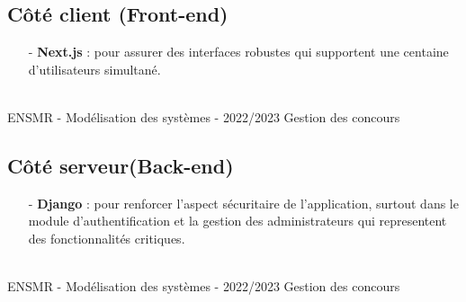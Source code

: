 \subsection{Côté client (Front-end)}
\begin{itemize}
	\item[-] \textbf{Next.js} : pour assurer des interfaces robustes qui supportent une centaine
	d'utilisateurs simultané.
\end{itemize}

\vfill
\noindent\makebox[\linewidth]{\rule{.8\paperwidth}{.6pt}}\\[0.2cm]
ENSMR - Modélisation des systèmes - 2022/2023 \hfill Gestion des concours
\noindent\makebox[\linewidth]{\rule{.8\paperwidth}{.6pt}}
\newpage

\subsection{Côté serveur(Back-end)}
\begin{itemize}
	\item[-] \textbf{Django} : pour renforcer l'aspect sécuritaire de 
	l'application, surtout dans le module d'authentification et la gestion des administrateurs
	qui representent des fonctionnalités critiques.
\end{itemize}

\vfill
\noindent\makebox[\linewidth]{\rule{.8\paperwidth}{.6pt}}\\[0.2cm]
ENSMR - Modélisation des systèmes - 2022/2023 \hfill Gestion des concours
\noindent\makebox[\linewidth]{\rule{.8\paperwidth}{.6pt}}
\newpage